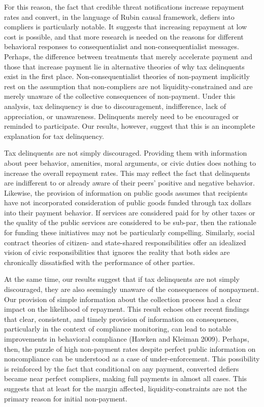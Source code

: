\documentclass[12pt,titlepage]{article}
\begin{document}
For this reason, the fact that credible threat notifications increase 
repayment rates and convert, in the language of Rubin causal framework, 
defiers into compliers is particularly notable. It suggests that 
increasing repayment at low cost is possible, and that more research is 
needed on the reasons for different behavioral responses to 
consequentialist and non-consequentialist messages. Perhaps, the difference 
between treatments that merely accelerate payment and those that increase 
payment lie in alternative theories of why tax delinquents exist in the 
first place. Non-consequentialist theories of non-payment implicitly rest 
on the assumption that non-compliers are not liquidity-constrained and are
merely unaware of the collective consequences of non-payment. Under this 
analysis, tax delinquency is due to discouragement, indifference, 
lack of appreciation, or unawareness. Delinquents merely need to be 
encouraged or reminded to participate. Our results, however, suggest 
that this is an incomplete explanation for tax delinquency. 

Tax delinquents are not simply discouraged. Providing them with 
information about peer behavior, amenities, moral arguments, or civic 
duties does nothing to increase the overall repayment rates. This may 
reflect the fact that delinquents are indifferent to or already aware 
of their peers’ positive and negative behavior. Likewise, the provision 
of information on public goods assumes that recipients have not 
incorporated consideration of public goods funded through tax dollars 
into their payment behavior. If services are considered paid for by 
other taxes or the quality of the public services are considered to be 
sub-par, then the rationale for funding these initiatives may not be 
particularly compelling.  Similarly, social contract theories of citizen- 
and state-shared responsibilities offer an idealized vision of civic 
responsibilities that ignores the reality that both sides are chronically 
dissatisfied with the performance of other parties.

At the same time, our results suggest that if tax delinquents are not 
simply discouraged, they are also seemingly unaware of the consequences 
of nonpayment. Our provision of simple information about the collection 
process had a clear impact on the likelihood of repayment. This result 
echoes other recent findings that clear, consistent, and timely provision 
of information on consequences, particularly in the context of compliance 
monitoring, can lead to notable improvements in behavioral compliance 
(Hawken and Kleiman 2009). Perhaps, then, the puzzle of high non-payment 
rates despite perfect public information on noncompliance can be understood 
as a case of under-enforcement. This possibility is reinforced by the fact 
that conditional on any payment, converted defiers became near perfect 
compliers, making full payments in almost all cases. This suggests that at 
least for the margin affected, liquidity-constraints are not the primary 
reason for initial non-payment.
\end{document}
